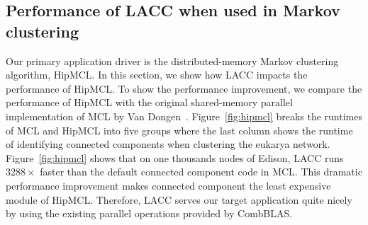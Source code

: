 \subsection{Performance of LACC when used in Markov clustering}
Our primary application driver is the distributed-memory Markov clustering algorithm, HipMCL.
In this section, we show how LACC impacts the performance of HipMCL.
To show the performance improvement, we compare the performance of HipMCL with the original shared-memory parallel implementation of MCL by Van Dongen~\cite{van2000graph}. 
Figure~\ref{fig:hipmcl} breaks the runtimes of MCL and HipMCL into five groups where the last column shows the runtime of identifying connected components when clustering the eukarya network. 
Figure~\ref{fig:hipmcl} shows that on one thousands nodes of Edison, LACC runs $3288\times$ faster than the default connected component code in MCL. 
This dramatic performance improvement makes connected component the least expensive module of HipMCL.
Therefore, LACC serves our target application quite nicely by using the existing parallel operations provided by CombBLAS. 




